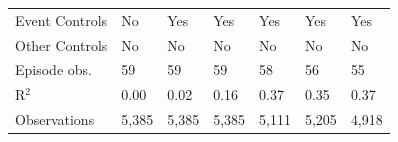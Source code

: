 \begin{tabularx}{\linewidth}{@{} l*{6}{Y} @{}}
Event Controls      &          No         &         Yes         &         Yes         &         Yes         &         Yes         &         Yes         \\
Other Controls      &          No         &          No         &          No         &          No         &          No         &          No         \\
Episode obs.        &          59         &          59         &          59         &          58         &          56         &          55         \\
R$^2$               &        0.00         &        0.02         &        0.16         &        0.37         &        0.35         &        0.37         \\
Observations        &       5,385         &       5,385         &       5,385         &       5,111         &       5,205         &       4,918         \\
\bottomrule
\end{tabularx}
